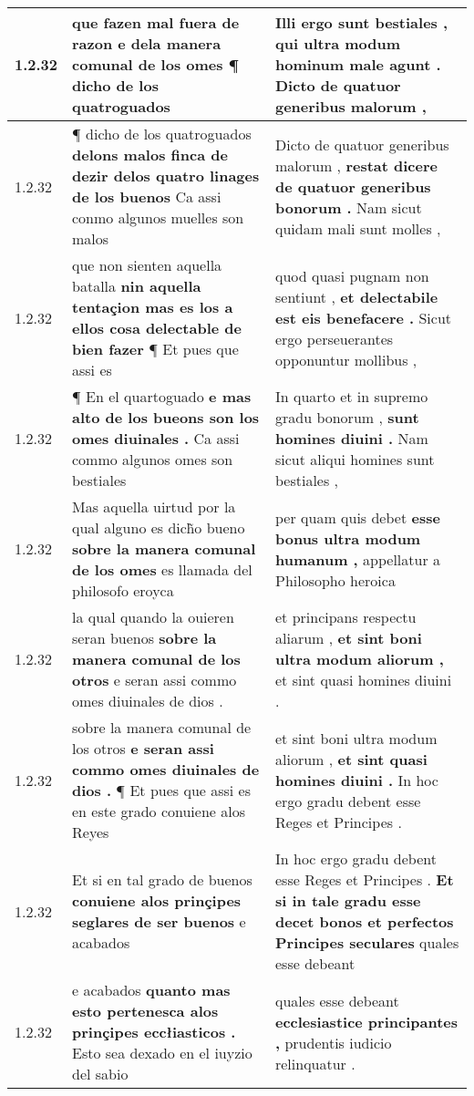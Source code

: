 \begin{tabular}{|p{1cm}|p{6.5cm}|p{6.5cm}|}
1.2.32 & que fazen mal fuera de razon \textbf{ e dela manera comunal de los omes } ¶ dicho de los quatroguados & Illi ergo sunt bestiales , \textbf{ qui ultra modum hominum male agunt . } Dicto de quatuor generibus malorum , \\\hline
1.2.32 & ¶ dicho de los quatroguados \textbf{ delons malos finca de dezir delos quatro linages de los buenos } Ca assi conmo algunos muelles son malos & Dicto de quatuor generibus malorum , \textbf{ restat dicere de quatuor generibus bonorum . } Nam sicut quidam mali sunt molles , \\\hline
1.2.32 & que non sienten aquella batalla \textbf{ nin aquella tentaçion mas es los a ellos cosa delectable de bien fazer } ¶ Et pues que assi es & quod quasi pugnam non sentiunt , \textbf{ et delectabile est eis benefacere . } Sicut ergo perseuerantes opponuntur mollibus , \\\hline
1.2.32 & ¶ En el quartoguado \textbf{ e mas alto de los bueons son los omes diuinales . } Ca assi commo algunos omes son bestiales & In quarto et in supremo gradu bonorum , \textbf{ sunt homines diuini . } Nam sicut aliqui homines sunt bestiales , \\\hline
1.2.32 & Mas aquella uirtud por la qual alguno es dich̃o bueno \textbf{ sobre la manera comunal de los omes } es llamada del philosofo eroyca & per quam quis debet \textbf{ esse bonus ultra modum humanum , } appellatur a Philosopho heroica \\\hline
1.2.32 & la qual quando la ouieren seran buenos \textbf{ sobre la manera comunal de los otros } e seran assi commo omes diuinales de dios . & et principans respectu aliarum , \textbf{ et sint boni ultra modum aliorum , } et sint quasi homines diuini . \\\hline
1.2.32 & sobre la manera comunal de los otros \textbf{ e seran assi commo omes diuinales de dios . } ¶ Et pues que assi es en este grado conuiene alos Reyes & et sint boni ultra modum aliorum , \textbf{ et sint quasi homines diuini . } In hoc ergo gradu debent esse Reges et Principes . \\\hline
1.2.32 & Et si en tal grado de buenos \textbf{ conuiene alos prinçipes seglares de ser buenos } e acabados & In hoc ergo gradu debent esse Reges et Principes . \textbf{ Et si in tale gradu esse decet bonos et perfectos Principes seculares } quales esse debeant \\\hline
1.2.32 & e acabados \textbf{ quanto mas esto pertenesca alos prinçipes eccłiasticos . } Esto sea dexado en el iuyzio del sabio & quales esse debeant \textbf{ ecclesiastice principantes , } prudentis iudicio relinquatur . \\\hline

\end{tabular}
